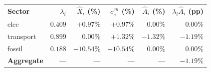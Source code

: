 \begin{tabular}{lrrrrr}
\hline
Sector & $\lambda_i$ & $\hat X_i$ (\%) & $\sigma_i^m$ (\%) & $\hat A_i$ (\%) & $\lambda_i \hat A_i$ (pp) \\
\hline
elec & $0.409$ & $+0.97 \% $ & $+0.97 \% $ & $0.00 \% $ & $0.00 \% $ \\
transport & $0.899$ & $0.00 \% $ & $+1.32 \% $ & $-1.32 \% $ & $-1.19 \% $ \\
fossil & $0.188$ & $-10.54 \% $ & $-10.54 \% $ & $0.00 \% $ & $0.00 \% $ \\
\hline
\textbf{Aggregate} & --- & --- & --- & --- & $-1.19 \% $ \\
\hline
\end{tabular}
